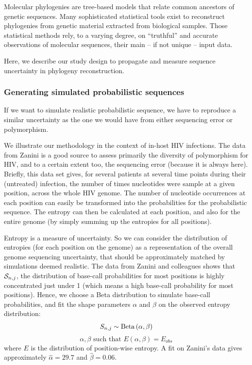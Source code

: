 \documentclass[10pt]{article}
\begin{document}
Molecular phylogenies are tree-based models that relate common ancestors of genetic sequences. Many sophisticated statistical tools exist to reconstruct phylogenies from genetic material extracted from biological samples. Those statistical methods rely, to a varying degree, on ``truthful'' and accurate observations of molecular sequences, their main -- if not unique -- input data.

Here, we describe our study design to propagate and measure sequence uncertainty in phylogeny reconstruction. 


\subsubsection{Generating simulated probabilistic sequences} 
\label{sec:zanini_poly}

If we want to simulate realistic probabilistic sequence, we have to reproduce a similar uncertainty as the one we would have from either sequencing error or polymorphism. 

We illustrate our methodology in the context of in-host HIV infections. 
The data from Zanini \cite{Zanini:2015} is a good source to assess primarily the diversity of polymorphism for HIV, and to a certain extent too, the sequencing error (because it is always here). 
Briefly, this data set gives, for several patients at several time points during their (untreated) infection, the number of times nucleotides were sample at a given position, across the whole HIV genome. 
The number of nucleotide occurrences at each position can easily be transformed into the probabilities for the probabilistic sequence. The entropy can then be calculated at each position, and also for the entire genome (by simply summing up the entropies for all positions). 

Entropy is a measure of uncertainty. So we can consider the distribution of entropies (for each position on the genome) as a representation of the overall genome sequencing uncertainty, that should be approximately matched by simulations deemed realistic. 
The data from Zanini and colleagues \cite{Zanini:2015} shows that $\mathcal{S}_{n,j}$, the distribution of base-call probabilities for most positions is highly concentrated just under 1 (which means a high base-call probability for most positions). 
Hence, we choose a Beta distribution to simulate base-call probabilities, and fit the shape parameters $\alpha$ and $\beta$ on the observed entropy distribution:
\begin{equation}
\label{eq:beta_sampling}
S_{n,j} \sim \mathrm{Beta}\left(\alpha, \beta\right)
\end{equation}
\begin{equation}
\alpha, \beta \text{ such that } E(\alpha,\beta) = E_{obs}
\end{equation}
where $E$ is the distribution of position-wise entropy.
A fit on Zanini's data \cite{Zanini:2015} gives approximately $\hat{\alpha} = 29.7$ and $\hat{\beta} = 0.06$. 
\end{document}
